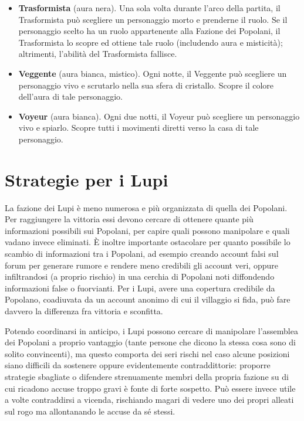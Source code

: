 \documentclass[a4paper,10pt]{article}
\begin{document}
\begin{itemize}
	\item {\bf Trasformista} (aura nera). Una sola volta durante l'arco della partita, il Trasformista può scegliere un personaggio morto e prenderne il ruolo. Se il personaggio scelto ha un ruolo appartenente alla Fazione dei Popolani, il Trasformista lo scopre ed ottiene tale ruolo (includendo aura e misticità); altrimenti, l'abilità del Trasformista fallisce.
	
	\item {\bf Veggente} (aura bianca, mistico). Ogni notte, il Veggente può scegliere un personaggio vivo e scrutarlo nella sua sfera di cristallo. Scopre il colore dell'aura di tale personaggio.
	
	\item {\bf Voyeur} (aura bianca). Ogni due notti, il Voyeur può scegliere un personaggio vivo e spiarlo. Scopre tutti i movimenti diretti verso la casa di tale personaggio.
	
\end{itemize}

\section{Strategie per i Lupi}

La fazione dei Lupi è meno numerosa e più organizzata di quella dei Popolani. Per raggiungere la vittoria essi devono cercare di ottenere quante più informazioni possibili sui Popolani, per capire quali possono manipolare e quali vadano invece eliminati. È inoltre importante ostacolare per quanto possibile lo scambio di informazioni tra i Popolani, ad esempio creando account falsi sul forum per generare rumore e rendere meno credibili gli account veri, oppure infiltrandosi (a proprio rischio) in una cerchia di Popolani noti diffondendo informazioni false o fuorvianti. Per i Lupi, avere una copertura credibile da Popolano, coadiuvata da un account anonimo di cui il villaggio si fida, può fare davvero la differenza fra vittoria e sconfitta.

Potendo coordinarsi in anticipo, i Lupi possono cercare di manipolare l'assemblea dei Popolani a proprio vantaggio (tante persone che dicono la stessa cosa sono di solito convincenti), ma questo comporta dei seri rischi nel caso alcune posizioni siano difficili da sostenere oppure evidentemente contraddittorie: proporre strategie sbagliate o difendere strenuamente membri della propria fazione su di cui ricadono accuse troppo gravi è fonte di forte sospetto. Può essere invece utile a volte contraddirsi a vicenda, rischiando magari di vedere uno dei propri alleati sul rogo ma allontanando le accuse da sé stessi.
\end{document}
